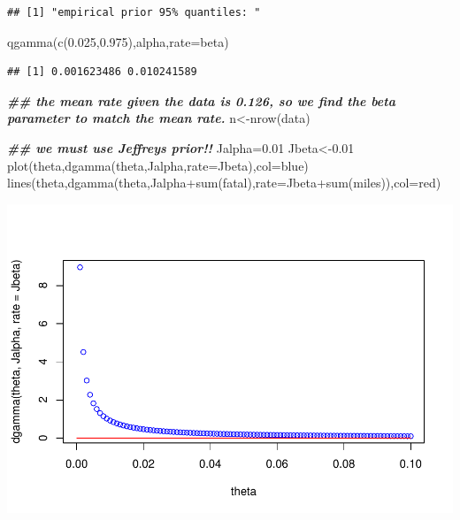 \documentclass[
]{book}
\newenvironment{Shaded}{\begin{snugshade}}{\end{snugshade}}
\newcommand{\AttributeTok}[1]{\textcolor[rgb]{0.77,0.63,0.00}{#1}}
\newcommand{\DocumentationTok}[1]{\textcolor[rgb]{0.56,0.35,0.01}{\textbf{\textit{#1}}}}
\newcommand{\FloatTok}[1]{\textcolor[rgb]{0.00,0.00,0.81}{#1}}
\newcommand{\FunctionTok}[1]{\textcolor[rgb]{0.00,0.00,0.00}{#1}}
\newcommand{\NormalTok}[1]{#1}
\newcommand{\OtherTok}[1]{\textcolor[rgb]{0.56,0.35,0.01}{#1}}
\newcommand{\SpecialCharTok}[1]{\textcolor[rgb]{0.00,0.00,0.00}{#1}}
\newcommand{\StringTok}[1]{\textcolor[rgb]{0.31,0.60,0.02}{#1}}
\theoremstyle{definition}
\theoremstyle{definition}
\theoremstyle{definition}
\theoremstyle{definition}
\theoremstyle{remark}
\begin{document}
\begin{verbatim}
## [1] "empirical prior 95% quantiles: "
\end{verbatim}

\begin{Shaded}
\begin{Highlighting}[]
   \FunctionTok{qgamma}\NormalTok{(}\FunctionTok{c}\NormalTok{(}\FloatTok{0.025}\NormalTok{,}\FloatTok{0.975}\NormalTok{),alpha,}\AttributeTok{rate=}\NormalTok{beta)}
\end{Highlighting}
\end{Shaded}

\begin{verbatim}
## [1] 0.001623486 0.010241589
\end{verbatim}

\begin{Shaded}
\begin{Highlighting}[]
   \DocumentationTok{\#\# the mean rate given the data is 0.126, so we find the beta parameter to match the mean rate.}
\NormalTok{   n}\OtherTok{\textless{}{-}}\FunctionTok{nrow}\NormalTok{(data)}
   
\DocumentationTok{\#\# we must use Jeffreys\textquotesingle{} prior!!     }
\NormalTok{  Jalpha}\OtherTok{=}\FloatTok{0.01}
\NormalTok{  Jbeta}\OtherTok{\textless{}{-}}\FloatTok{0.01}
 \FunctionTok{plot}\NormalTok{(theta,}\FunctionTok{dgamma}\NormalTok{(theta,Jalpha,}\AttributeTok{rate=}\NormalTok{Jbeta),}\AttributeTok{col=}\StringTok{\textquotesingle{}blue\textquotesingle{}}\NormalTok{)}
\FunctionTok{lines}\NormalTok{(theta,}\FunctionTok{dgamma}\NormalTok{(theta,Jalpha}\SpecialCharTok{+}\FunctionTok{sum}\NormalTok{(fatal),}\AttributeTok{rate=}\NormalTok{Jbeta}\SpecialCharTok{+}\FunctionTok{sum}\NormalTok{(miles)),}\AttributeTok{col=}\StringTok{\textquotesingle{}red\textquotesingle{}}\NormalTok{)}
\end{Highlighting}
\end{Shaded}

\includegraphics{_main_files/figure-latex/unnamed-chunk-25-1.pdf}
\end{document}
